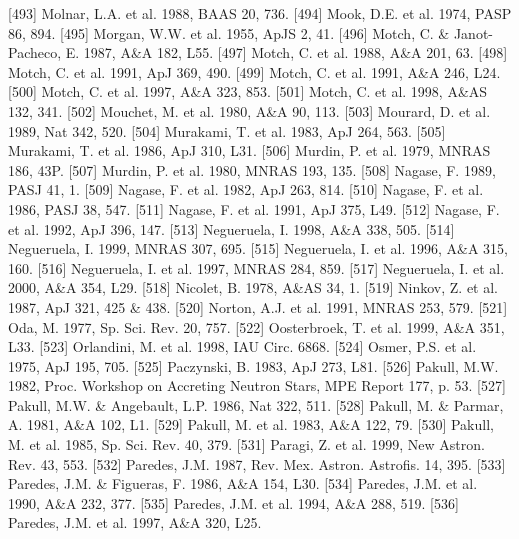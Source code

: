 \documentclass{aa}
\begin{document}
\begin{thebibliography}{}
\bibitem[]{}[493] Molnar, L.A. et al. 1988, BAAS 20, 736.
\bibitem[]{}[494] Mook, D.E. et al. 1974, PASP 86, 894.
\bibitem[]{}[495] Morgan, W.W. et al. 1955, ApJS 2, 41.
\bibitem[]{}[496] Motch, C. \& Janot-Pacheco, E. 1987, A\&A 182, L55.
\bibitem[]{}[497] Motch, C. et al. 1988, A\&A 201, 63.
\bibitem[]{}[498] Motch, C. et al. 1991, ApJ 369, 490.
\bibitem[]{}[499] Motch, C. et al. 1991, A\&A 246, L24.
\bibitem[]{}[500] Motch, C. et al. 1997, A\&A 323, 853. 
\bibitem[]{}[501] Motch, C. et al. 1998, A\&AS 132, 341.
\bibitem[]{}[502] Mouchet, M. et al. 1980, A\&A 90, 113.
\bibitem[]{}[503] Mourard, D. et al. 1989, Nat 342, 520.
\bibitem[]{}[504] Murakami, T. et al. 1983, ApJ 264, 563.
\bibitem[]{}[505] Murakami, T. et al. 1986, ApJ 310, L31.
\bibitem[]{}[506] Murdin, P. et al. 1979, MNRAS 186, 43P.
\bibitem[]{}[507] Murdin, P. et al. 1980, MNRAS 193, 135.
\bibitem[]{}[508] Nagase, F. 1989, PASJ 41, 1.
\bibitem[]{}[509] Nagase, F. et al. 1982, ApJ 263, 814.
\bibitem[]{}[510] Nagase, F. et al. 1986, PASJ 38, 547.
\bibitem[]{}[511] Nagase, F. et al. 1991, ApJ 375, L49.
\bibitem[]{}[512] Nagase, F. et al. 1992, ApJ 396, 147.
\bibitem[]{}[513] Negueruela, I. 1998, A\&A 338, 505.
\bibitem[]{}[514] Negueruela, I. 1999, MNRAS 307, 695.
\bibitem[]{}[515] Negueruela, I. et al. 1996, A\&A 315, 160.
\bibitem[]{}[516] Negueruela, I. et al. 1997, MNRAS 284, 859.
\bibitem[]{}[517] Negueruela, I. et al. 2000, A\&A 354, L29.
\bibitem[]{}[518] Nicolet, B. 1978, A\&AS 34, 1.
\bibitem[]{}[519] Ninkov, Z. et al. 1987, ApJ 321, 425 \& 438.
\bibitem[]{}[520] Norton, A.J. et al. 1991, MNRAS 253, 579.
\bibitem[]{}[521] Oda, M. 1977, Sp. Sci. Rev. 20, 757.
\bibitem[]{}[522] Oosterbroek, T. et al. 1999, A\&A 351, L33.
\bibitem[]{}[523] Orlandini, M. et al. 1998, IAU Circ. 6868.
\bibitem[]{}[524] Osmer, P.S. et al. 1975, ApJ 195, 705.
\bibitem[]{}[525] Paczynski, B. 1983, ApJ 273, L81.
\bibitem[]{}[526] Pakull, M.W. 1982, Proc. Workshop on Accreting Neutron Stars, MPE Report 177, p. 53.
\bibitem[]{}[527] Pakull, M.W. \& Angebault, L.P. 1986, Nat 322, 511.
\bibitem[]{}[528] Pakull, M. \& Parmar, A. 1981, A\&A 102, L1.
\bibitem[]{}[529] Pakull, M. et al. 1983, A\&A 122, 79.
\bibitem[]{}[530] Pakull, M. et al. 1985, Sp. Sci. Rev. 40, 379.
\bibitem[]{}[531] Paragi, Z. et al. 1999, New Astron. Rev. 43, 553.
\bibitem[]{}[532] Paredes, J.M. 1987, Rev. Mex. Astron. Astrofis. 14, 395.
\bibitem[]{}[533] Paredes, J.M. \& Figueras, F. 1986, A\&A 154, L30.
\bibitem[]{}[534] Paredes, J.M. et al. 1990, A\&A 232, 377.
\bibitem[]{}[535] Paredes, J.M. et al. 1994, A\&A 288, 519.
\bibitem[]{}[536] Paredes, J.M. et al. 1997, A\&A 320, L25.

\end{thebibliography}
\end{document}
